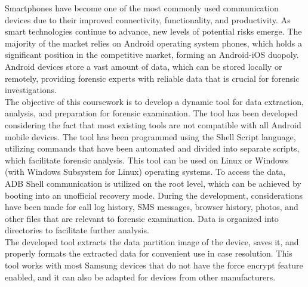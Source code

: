 Smartphones have become one of the most commonly used communication devices due to their improved connectivity, functionality, and productivity. As smart technologies continue to advance, new levels of potential risks emerge. The majority of the market relies on Android operating system phones, which holds a significant position in the competitive market, forming an Android-iOS duopoly. Android devices store a vast amount of data, which can be stored locally or remotely, providing forensic experts with reliable data that is crucial for forensic investigations.\\

The objective of this coursework is to develop a dynamic tool for data extraction, analysis, and preparation for forensic examination. The tool has been developed considering the fact that most existing tools are not compatible with all Android mobile devices. The tool has been programmed using the Shell Script language, utilizing commands that have been automated and divided into separate scripts, which facilitate forensic analysis. This tool can be used on Linux or Windows (with Windows Subsystem for Linux) operating systems. To access the data, ADB Shell communication is utilized on the root level, which can be achieved by booting into an unofficial recovery mode. During the development, considerations have been made for call log history, SMS messages, browser history, photos, and other files that are relevant to forensic examination. Data is organized into directories to facilitate further analysis.\\

The developed tool extracts the data partition image of the device, saves it, and properly formats the extracted data for convenient use in case resolution. This tool works with most Samsung devices that do not have the force encrypt feature enabled, and it can also be adapted for devices from other manufacturers.\\